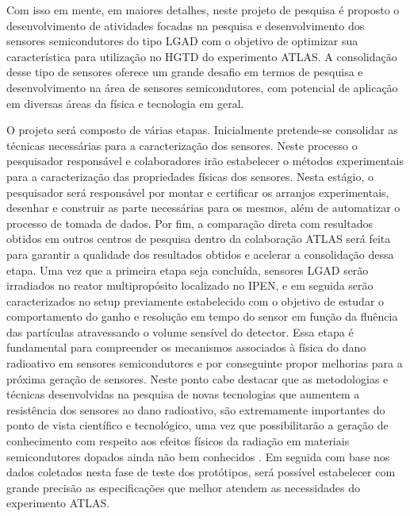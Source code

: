 Com isso em mente, em maiores detalhes, neste projeto de pesquisa é proposto o desenvolvimento de atividades focadas na pesquisa e desenvolvimento dos sensores semicondutores do tipo LGAD com o objetivo de optimizar sua característica para utilização no HGTD do experimento ATLAS. A consolidação desse tipo de sensores oferece um grande desafio em termos de pesquisa e desenvolvimento na área de sensores semicondutores, com potencial de aplicação em diversas áreas da física e tecnologia em geral. 

O projeto será composto de várias etapas. Inicialmente pretende-se consolidar as técnicas necessárias para a caracterização dos sensores. Neste processo o pesquisador responsável e colaboradores irão estabelecer o métodos experimentais para a caracterização das propriedades físicas dos sensores. Nesta estágio, o pesquisador será responsável por montar e certificar os arranjos experimentais, desenhar e construir as parte necessárias para os mesmos, além de automatizar o processo de tomada de dados. Por fim, a comparação direta com resultados obtidos em outros centros de pesquisa dentro da colaboração ATLAS será feita para garantir a qualidade dos resultados obtidos e acelerar a consolidação dessa etapa.  
Uma vez que a primeira etapa seja concluída, sensores LGAD serão irradiados no reator multipropósito localizado no IPEN, e em seguida serão caracterizados no setup previamente estabelecido com o objetivo de estudar o comportamento do ganho e resolução em tempo do sensor em função da fluência das partículas atravessando o volume sensível do detector. Essa etapa é fundamental para compreender os mecanismos associados à física do dano radioativo em sensores semicondutores e por conseguinte propor melhorias para a próxima geração de sensores. 
Neste ponto cabe destacar que as metodologias e técnicas desenvolvidas na pesquisa de novas tecnologias que aumentem a resistência dos sensores ao dano radioativo, são extremamente importantes do ponto de vista científico e tecnológico, uma vez que possibilitarão a geração de conhecimento com respeito aos efeitos físicos da radiação em materiais semicondutores dopados ainda não bem conhecidos \cite{tdr,JIN_LGAD,NIMA_LGAD}. %
Em seguida com base nos dados coletados nesta fase de teste dos protótipos, será possível estabelecer com grande precisão as especificações que melhor atendem as necessidades do experimento ATLAS. 

